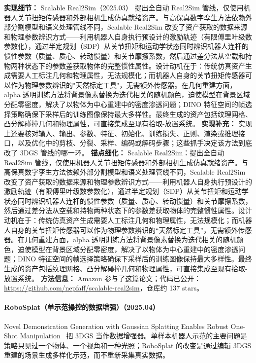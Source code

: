 \textbf{实现细节：} Scalable Real2Sim（2025.03） 提出全自动 Real2Sim 管线，仅使用机器人关节扭矩传感器和外部相机生成仿真就绪资产。与高保真数字孪生方法依赖外部分割模型和语义处理管线不同，Scalable Real2Sim 改变了资产获取的数据来源和物理参数辨识方式——利用机器人自身执行预设计的激励轨迹（有限傅里叶级数参数化），通过半定规划（SDP）从关节扭矩和运动学状态同时辨识机器人连杆的惯性参数（质量、质心、转动惯量）和关节摩擦系数，然后通过差分法从空载和持物两种状态下的参数差获取物体的完整惯性属性。设计动机在于：传统仿真资产生成需要人工标注几何和物理属性，无法规模化；而机器人自身的关节扭矩传感器可以作为物理参数辨识的"天然标定工具"，无需额外传感器。在几何重建方面，alpha 透明训练方法将背景像素替换为迭代相关的随机颜色，迫使模型在背景区域分配零密度，解决了以物体为中心重建中的密度渗透问题；DINO 特征空间的帧选择策略确保下采样后的训练图像保持最大多样性。最终生成的资产包括纹理网格、凸分解碰撞几何和物理属性，可直接集成至现有拾取-放置系统。
\textbf{实现补充：} 实现上还要核对输入、输出、参数、特征、初始化、训练损失、正则、渲染或推理接口，以及优化中的剪枝、分裂、采样、编码或解码步骤；这些抓手决定该方法到底改了 3DGS 管线的哪一环。
\textbf{锚点细化：} Scalable Real2Sim：提出全自动 Real2Sim 管线，仅使用机器人关节扭矩传感器和外部相机生成仿真就绪资产。与高保真数字孪生方法依赖外部分割模型和语义处理管线不同，Scalable Real2Sim 改变了资产获取的数据来源和物理参数辨识方式——利用机器人自身执行预设计的激励轨迹（有限傅里叶级数参数化），通过半定规划（SDP）从关节扭矩和运动学状态同时辨识机器人连杆的惯性参数（质量、质心、转动惯量）和关节摩擦系数，然后通过差分法从空载和持物两种状态下的参数差获取物体的完整惯性属性。设计动机在于：传统仿真资产生成需要人工标注几何和物理属性，无法规模化；而机器人自身的关节扭矩传感器可以作为物理参数辨识的``天然标定工具''，无需额外传感器。在几何重建方面，alpha 透明训练方法将背景像素替换为迭代相关的随机颜色，迫使模型在背景区域分配零密度，解决了以物体为中心重建中的密度渗透问题；DINO 特征空间的帧选择策略确保下采样后的训练图像保持最大多样性。最终生成的资产包括纹理网格、凸分解碰撞几何和物理属性，可直接集成至现有拾取-放置系统。
\textbf{方法信息：} Amazon 参与了这篇论文；代码已公开：\url{https://github.com/nepfaff/scalable-real2sim}，仓库约 137 stars。



\paragraph{RoboSplat（单示范操控的数据增强）（2025.04）}
Novel Demonstration Generation with Gaussian Splatting Enables Robust One-Shot Manipulation~\cite{2504_13175} 把 3DGS 当作数据增强器。单样本机器人示范的主要问题是策略只见过一个物体、一个视角和一种光照；RoboSplat 的改变是通过编辑 3DGS 重建的场景生成多样化示范，而不重新采集真实数据。

